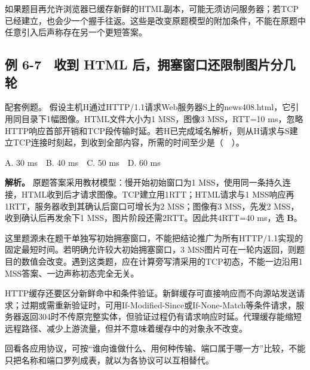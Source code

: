 如果题目再允许浏览器已缓存新鲜的HTML副本，可能无须访问服务器；若TCP已经建立，也会少一个握手往返。这些是改变原题模型的附加条件，不能在原题中任意引入后声称存在另一个更短答案。

\subsection{例 6-7　收到 HTML 后，拥塞窗口还限制图片分几轮}\label{CN06-ex7}

\begin{example}[配套例题]

配套例题。 假设主机H通过HTTP/1.1请求Web服务器S上的news408.html，它引用同目录下1幅图像。HTML文件大小为1 MSS，图像3 MSS，RTT=10 ms，忽略HTTP响应首部开销和TCP段传输时延。若H已完成域名解析，则从H请求与S建立TCP连接时刻起，到收到全部内容，所需的时间至少是（　）。

A. 30 ms　B. 40 ms　C. 50 ms　D. 60 ms

\end{example}

\textbf{解析。} 原题答案采用教材模型：慢开始初始窗口为1 MSS，使用同一条持久连接，HTML收到后才请求图像。TCP建立用1RTT；HTML请求与1 MSS响应再1RTT，服务器收到其确认后窗口可增长为2 MSS；图像有3 MSS，先发2 MSS，收到确认后再发余下1 MSS，图片阶段还需2RTT。因此共4RTT=40 ms，选 \textbf{B}。

这里题源未在题干单独写初始拥塞窗口，不能把结论推广为所有HTTP/1.1实现的固定最短时间。若明确允许较大初始拥塞窗口，3 MSS图片可在一轮内返回，则题目的数值会改变。遇到这类题，应在计算旁写清采用的TCP初态，不能一边沿用1 MSS答案、一边声称初态完全无关。

HTTP缓存还要区分新鲜命中和条件验证。新鲜缓存可直接响应而不向源站发送请求；过期或需重新验证时，可用If-Modified-Since或If-None-Match等条件请求，服务器返回304时不传原完整实体，但验证过程仍有请求响应时延。代理缓存能缩短远程路径、减少上游流量，但并不意味着缓存中的对象永不改变。

回看各应用协议，可按``谁向谁做什么、用何种传输、端口属于哪一方''比较，不能只把名称和端口罗列成表，就以为各协议可以互相替代。

